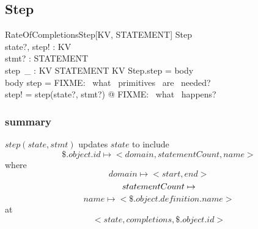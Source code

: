 \documentclass[../main.tex]{subfiles}
\begin{document}
\subsection{Step}
\begin{schema}{RateOfCompletionsStep[KV, STATEMENT]}
  Step \\
  state?, step! : KV \\
  stmt? : STATEMENT \\
  step~\_ : KV \cross STATEMENT \surj KV
  \where
  Step.step = \langle body \rangle \\
  \langle body \rangle \bindsto step = \langle FIXME: ~what ~primitives ~are ~needed? \rangle \\
  step! = step(state?, stmt?) @  FIXME: ~what ~happens?
\end{schema}
\subsubsection{summary}
$step(state, stmt)$ updates $state$ to include
$$\$.object.id \mapsto <domain, statementCount, name>$$
where
$$domain \mapsto <start, end> $$
$$statementCount \mapsto \real$$
$$name \mapsto <\$.object.definition.name>$$
at
$$<state, completions, \$.object.id>$$
\end{document}
